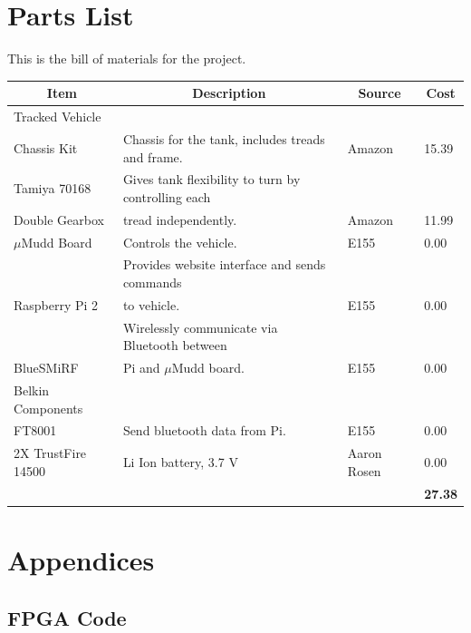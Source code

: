 \documentclass[12pt]{article}
\begin{document}
\section{Parts List}
This is the bill of materials for the project.
\begin{center}
\begin{tabular}{|l|l|l|l|}
\hline
\multicolumn{1}{|c|}{\textbf{Item}} & \multicolumn{1}{c|}{\textbf{Description}}               	& \multicolumn{1}{c|}{\textbf{Source}} & \multicolumn{1}{c|}{\textbf{Cost}} \\ \hline
Tracked Vehicle 			&										&							&	\\
			Chassis Kit	& Chassis for the tank, includes treads and frame.    	& Amazon 					& 15.39                          	\\ \hline
Tamiya 70168				& Gives tank flexibility to turn by controlling each     	& 							& \\
Double Gearbox			& tread independently.						& Amazon		               			& 11.99                             	\\ \hline
$\mu$Mudd Board                	& Controls the vehicle.                                                & E155                                 		& 0.00                               	\\ \hline
			                      	& Provides website interface and sends commands 	&							&\\
Raspberry Pi 2			    	& to vehicle.             							& E155                                 		& 0.00                               	\\ \hline
                        				& Wirelessly communicate via Bluetooth between  	&							&\\
BlueSMiRF				& Pi and $\mu$Mudd board.		 			& E155                                		& 0.00                               	\\ \hline
Belkin Components			&										&							&					\\ 
FT8001					& Send bluetooth data from Pi.					& E155                                		& 0.00                               	\\ \hline
2X TrustFire 14500			& Li Ion battery, 3.7 V 						& Aaron Rosen					& 0.00				\\ \hline
						& 										& 							& {\bf 27.38}			\\ \hline
\end{tabular}
\end{center}


\section{Appendices}
\subsection{FPGA Code}

\end{document}
